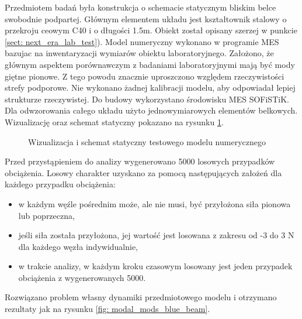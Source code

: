 Przedmiotem badań była konstrukcja o schemacie statycznym bliskim belce swobodnie podpartej. Głównym elementem układu jest kształtownik stalowy o przekroju ceowym C40 i o długości 1.5m. Obiekt został opisany szerzej w punkcie \ref{sect: next_era_lab_test}).  Model numeryczny wykonano w programie MES bazujac na inwentaryzacji wymiarów obiektu laboratoryjnego. Założono, że głównym aspektem porównawczym z badaniami laboratoryjnymi mają być mody giętne pionowe. Z tego powodu znacznie uproszczono względem rzeczywistości strefy podporowe. Nie wykonano żadnej kalibracji modelu, aby odpowiadał lepiej strukturze rzeczywistej. Do budowy wykorzystano środowisku MES SOFiSTiK. Dla odwzorowania całego układu użyto jednowymiarowych elementów belkowych. Wizualizację oraz schemat statyczny pokazano na rysunku \ref{fig: test_beam_wis_model}.
\begin{figure}[h]
	\centering
	\captionsetup{justification=centering}
	\caption{Wizualizacja i schemat statyczny testowego modelu numerycznego}
	\label{fig: test_beam_wis_model}
\end{figure}




Przed przystąpieniem do analizy wygenerowano 5000 losowych przypadków obciążenia. Losowy charakter uzyskano za pomocą następujących założeń dla każdego przypadku obciążenia:
\begin{itemize}[noitemsep]
	\item w każdym węźle pośrednim może, ale nie musi, być przyłożona siła pionowa lub poprzeczna,
	\item jeśli siła została przyłożona, jej wartość jest losowana z zakresu od -3 do 3 N dla każdego węzła indywidualnie,
	\item w trakcie analizy, w każdym kroku czasowym losowany jest jeden przypadek obciążenia z wygenerowanych 5000.
\end{itemize}
Rozwiązano problem własny dynamiki przedmiotowego modelu i otrzymano rezultaty jak na rysunku \ref{fig: modal_mods_blue_beam}.

